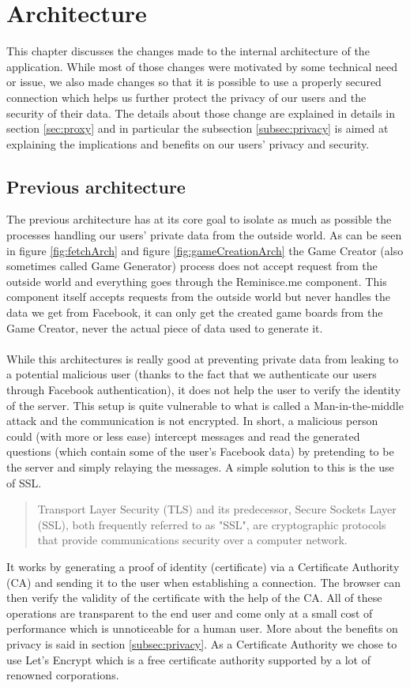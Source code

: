 \chapter{Architecture}
This chapter discusses the changes made to the internal architecture of the application. While most of those changes were motivated by some technical need or issue, we also made changes so that it is possible to use a properly secured connection which helps us further protect the privacy of our users and the security of their data. The details about those change are explained in details in section \ref{sec:proxy} and in particular the subsection \ref{subsec:privacy} is aimed at explaining the implications and benefits on our users' privacy and security.
\section{Previous architecture}
The previous architecture has at its core goal to isolate as much as possible the processes handling our users' private data from the outside world. As can be seen in figure \ref{fig:fetchArch} and figure \ref{fig:gameCreationArch} the Game Creator (also sometimes called Game Generator) process does not accept request from the outside world and everything goes through the Reminisce.me component. This component itself accepts requests from the outside world but never handles the data we get from Facebook, it can only get the created game boards from the Game Creator, never the actual piece of data used to generate it.\\\\
While this architectures is really good at preventing private data from leaking to a potential malicious user (thanks to the fact that we authenticate our users through Facebook authentication), it does not help the user to verify the identity of the server. This setup is quite vulnerable to what is called a Man-in-the-middle attack\cite{mitm} and the communication is not encrypted. In short, a malicious person could (with more or less ease) intercept messages and read the generated questions (which contain some of the user's Facebook data) by pretending to be the server and simply relaying the messages.
A simple solution to this is the use of SSL\cite{whyssl}.\blockquote{Transport Layer Security (TLS) and its predecessor, Secure Sockets Layer (SSL), both frequently referred to as "SSL", are cryptographic protocols that provide communications security over a computer network.\cite{ssl}}
It works by generating a proof of identity (certificate) via a Certificate Authority\cite{ca} (CA) and sending it to the user when establishing a connection. The browser can then verify the validity of the certificate with the help of the CA. All of these operations are transparent to the end user and come only at a small cost of performance which is unnoticeable for a human user. More about the benefits on privacy is said in section \ref{subsec:privacy}. As a Certificate Authority we chose to use Let's Encrypt\cite{letsencrypt} which is a free certificate authority supported by a lot of renowned corporations.

